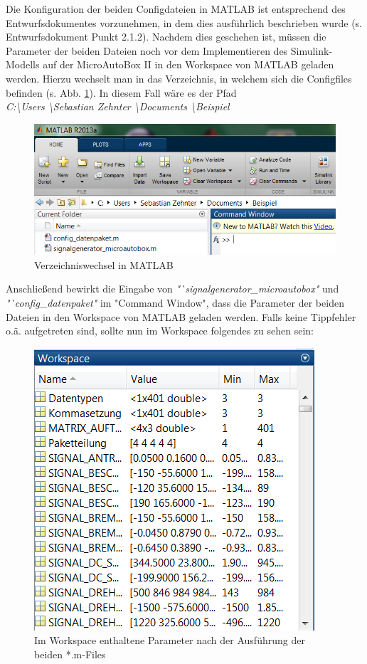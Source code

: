 \documentclass[fontsize = 12pt, paper = a4]{scrreprt}
\begin{document}
Die Konfiguration der beiden Configdateien in MATLAB ist entsprechend des Entwurfsdokumentes vorzunehmen, in dem dies ausführlich beschrieben wurde (s. Entwurfsdokument Punkt 2.1.2). Nachdem dies geschehen ist, müssen die Parameter der beiden Dateien noch vor dem Implementieren des Simulink-Modells auf der MicroAutoBox II in den Workspace von MATLAB geladen werden. Hierzu wechselt man in das Verzeichnis, in welchem sich die Configfiles befinden (s. Abb. \ref{configfilespfad}). In diesem Fall wäre es der Pfad \\ \textit{C:\textbackslash Users \textbackslash Sebastian Zehnter \textbackslash Documents \textbackslash Beispiel}

\begin{figure}[h]
\centering
\includegraphics[scale = 0.65]{configfilespfad}
\caption[Verzeichniswechsel in MATLAB]{Verzeichniswechsel in MATLAB}
\label{configfilespfad}
\end{figure} 

Anschließend bewirkt die Eingabe von \textit{"`signalgenerator\_microautobox"} und \textit{"`config\_datenpaket"} im "Command Window", dass die Parameter der beiden Dateien in den Workspace von MATLAB geladen werden. Falls keine Tippfehler o.ä. aufgetreten sind, sollte nun im Workspace folgendes zu sehen sein: 

\begin{figure}[h]
\centering
\includegraphics[scale = 0.65]{configfilesworkspace}
\caption[Parameter im Workspace]{Im Workspace enthaltene Parameter nach der Ausführung der beiden *.m-Files}
\label{configfilesworkspace}
\end{figure}  
\end{document}
